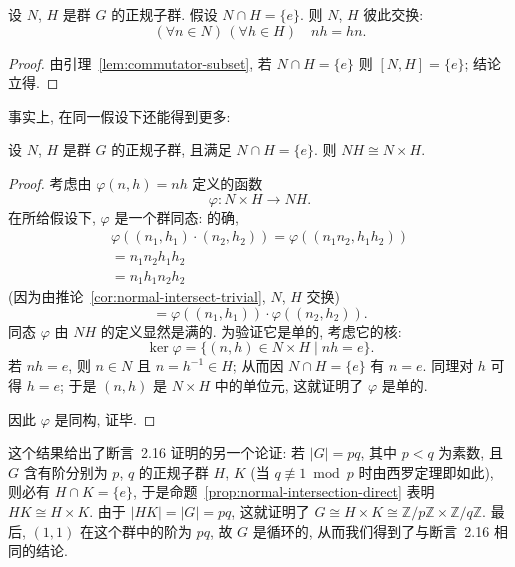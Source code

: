 \begin{corollary}
\label{cor:normal-intersect-trivial}
设 $N$, $H$ 是群 $G$ 的正规子群. 假设 $N \cap H = \{e\}$. 则 $N$, $H$ 彼此交换:
\[
(\forall n \in N)\,(\forall h \in H) \quad n h = h n.
\]
\end{corollary}

\begin{proof}
由引理~\ref{lem:commutator-subset}, 若 $N \cap H = \{e\}$ 则 $[N, H] = \{e\}$; 结论立得.
\end{proof}

事实上, 在同一假设下还能得到更多:

\begin{proposition}
\label{prop:normal-intersection-direct}
设 $N$, $H$ 是群 $G$ 的正规子群, 且满足 $N \cap H = \{e\}$. 则 $NH \cong N \times H$.
\end{proposition}

\begin{proof}
考虑由 $\varphi(n, h) = nh$ 定义的函数
\[
\varphi : N \times H \to N H.
\]
在所给假设下, $\varphi$ 是一个群同态: 的确,
\[
\begin{array}{r}
\varphi((n_1, h_1) \cdot (n_2, h_2)) = \varphi((n_1 n_2, h_1 h_2)) \\
= n_1 n_2 h_1 h_2 \\
= n_1 h_1 n_2 h_2
\end{array}
\]
(因为由推论~\ref{cor:normal-intersect-trivial}, $N$, $H$ 交换)
\[
= \varphi((n_1, h_1)) \cdot \varphi((n_2, h_2)).
\]
同态 $\varphi$ 由 $NH$ 的定义显然是满的. 为验证它是单的, 考虑它的核:
\[
\ker \varphi = \{(n, h) \in N \times H \mid n h = e\}.
\]
若 $nh = e$, 则 $n \in N$ 且 $n = h^{-1} \in H$; 从而因 $N \cap H = \{e\}$ 有 $n = e$. 同理对 $h$ 可得 $h = e$; 于是 $(n, h)$ 是 $N \times H$ 中的单位元, 这就证明了 $\varphi$ 是单的.

因此 $\varphi$ 是同构, 证毕.
\end{proof}

\begin{remark}
\label{rem:pq-cyclic-alt}
这个结果给出了断言~2.16 证明的另一个论证: 若 $|G| = pq$, 其中 $p < q$ 为素数, 且 $G$ 含有阶分别为 $p$, $q$ 的正规子群 $H$, $K$ (当 $q \not\equiv 1 \bmod p$ 时由西罗定理即如此), 则必有 $H \cap K = \{e\}$, 于是命题~\ref{prop:normal-intersection-direct} 表明 $HK \cong H \times K$. 由于 $|HK| = |G| = pq$, 这就证明了 $G \cong H \times K \cong \mathbb{Z}/p\mathbb{Z} \times \mathbb{Z}/q\mathbb{Z}$. 最后, $(1, 1)$ 在这个群中的阶为 $pq$, 故 $G$ 是循环的, 从而我们得到了与断言~2.16 相同的结论.
\end{remark}

